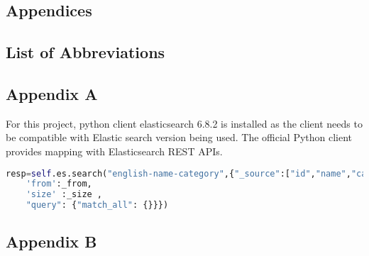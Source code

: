 

\begin{appendices}

\chapter*{Appendices}
\section{List of Abbreviations}

\section{Appendix A}
For this project, python client elasticsearch 6.8.2 is installed as the client needs to be compatible with Elastic search version being used. The official Python client provides mapping with Elasticsearch REST APIs.

\begin{lstlisting}[language=Python,caption={Elastic search},label={code:es_search}]
    resp=self.es.search("english-name-category",{"_source":["id","name","category"],
    'from':_from,
    'size' :_size ,
    "query": {"match_all": {}}})
    \end{lstlisting}

\section{Appendix B}

\end{appendices}
